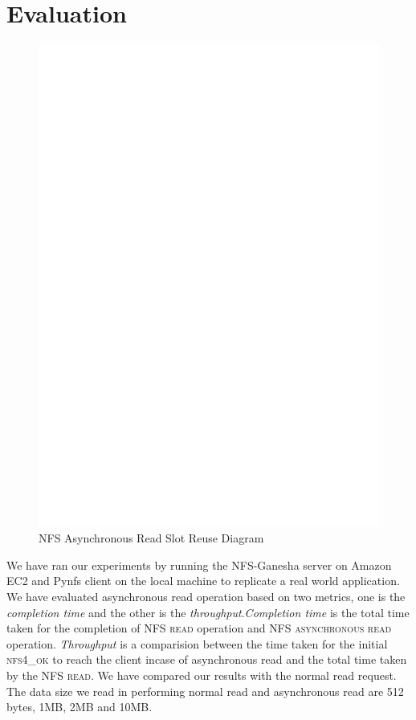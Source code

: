 \section{Evaluation}
\label{sec:Evaluation}

\begin{figure}
\centering
\includegraphics[scale=0.7]{figures/Slotreuse.eps}
\caption{NFS Asynchronous Read Slot Reuse Diagram}
\label{fig:NFSSlotreuse}
\end{figure}


	We have ran our experiments by running the NFS-Ganesha server on Amazon EC2 and Pynfs client on the local machine to replicate a real world application.  We have evaluated asynchronous read operation based on two metrics, one is the \textit{completion time} and the other is the \textit{throughput}.\textit{Completion time} is the total time taken for the completion of \textsc{NFS read} operation and \textsc{NFS asynchronous read} operation. \textit{Throughput} is a comparision between the time taken for the initial \textsc{nfs4\_ok} to reach the client incase of asynchronous read and the total time taken by the \textsc{NFS read}. We have compared our results with the normal read request. The data size we read in performing normal read and asynchronous read are 512 bytes, 1MB, 2MB and 10MB. 



